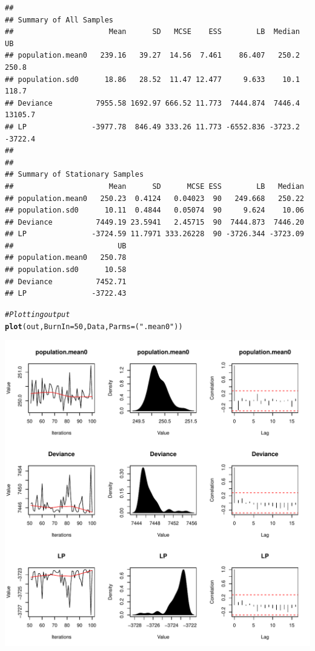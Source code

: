 \documentclass{article}\usepackage[]{graphicx}\usepackage[]{color}
\makeatletter
\def\maxwidth{ %
  \ifdim\Gin@nat@width>\linewidth
    \linewidth
  \else
    \Gin@nat@width
  \fi
}
\newcommand{\hlnum}[1]{\textcolor[rgb]{0.686,0.059,0.569}{#1}}%
\newcommand{\hlstr}[1]{\textcolor[rgb]{0.192,0.494,0.8}{#1}}%
\newcommand{\hlcom}[1]{\textcolor[rgb]{0.678,0.584,0.686}{\textit{#1}}}%
\newcommand{\hlstd}[1]{\textcolor[rgb]{0.345,0.345,0.345}{#1}}%
\newcommand{\hlkwc}[1]{\textcolor[rgb]{0.333,0.667,0.333}{#1}}%
\newcommand{\hlkwd}[1]{\textcolor[rgb]{0.737,0.353,0.396}{\textbf{#1}}}%
\newenvironment{kframe}{%
 \def\at@end@of@kframe{}%
 \ifinner\ifhmode%
  \def\at@end@of@kframe{\end{minipage}}%
  \begin{minipage}{\columnwidth}%
 \fi\fi%
 \def\FrameCommand##1{\hskip\@totalleftmargin \hskip-\fboxsep
 \colorbox{shadecolor}{##1}\hskip-\fboxsep
     \hskip-\linewidth \hskip-\@totalleftmargin \hskip\columnwidth}%
 \MakeFramed {\advance\hsize-\width
   \@totalleftmargin\z@ \linewidth\hsize
   \@setminipage}}%
 {\par\unskip\endMakeFramed%
 \at@end@of@kframe}
\newenvironment{knitrout}{}{} %
\makeatother
\begin{document}
\begin{knitrout}
\begin{kframe}
\begin{verbatim}
## 
## Summary of All Samples
##                      Mean      SD   MCSE    ESS        LB  Median      UB
## population.mean0   239.16   39.27  14.56  7.461    86.407   250.2   250.8
## population.sd0      18.86   28.52  11.47 12.477     9.633    10.1   118.7
## Deviance          7955.58 1692.97 666.52 11.773  7444.874  7446.4 13105.7
## LP               -3977.78  846.49 333.26 11.773 -6552.836 -3723.2 -3722.4
## 
## 
## Summary of Stationary Samples
##                      Mean      SD      MCSE ESS        LB   Median
## population.mean0   250.23  0.4124   0.04023  90   249.668   250.22
## population.sd0      10.11  0.4844   0.05074  90     9.624    10.06
## Deviance          7449.19 23.5941   2.45715  90  7444.873  7446.20
## LP               -3724.59 11.7971 333.26228  90 -3726.344 -3723.09
##                        UB
## population.mean0   250.78
## population.sd0      10.58
## Deviance          7452.71
## LP               -3722.43
\end{verbatim}
\begin{alltt}
\hlcom{# Plotting output}
\hlkwd{plot}\hlstd{(out,} \hlkwc{BurnIn} \hlstd{=} \hlnum{50}\hlstd{, Data,} \hlkwc{Parms} \hlstd{= (}\hlstr{".mean0"}\hlstd{))}
\end{alltt}
\end{kframe}
\includegraphics[width=\maxwidth]{figure/unnamed-chunk-4} 
\begin{kframe}\begin{alltt}

\end{alltt}
\end{kframe}
\end{knitrout}
\end{document}
